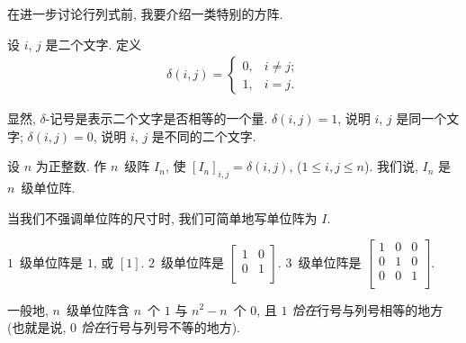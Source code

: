 在进一步讨论行列式前,
我要介绍一类特别的方阵.

\begin{definition}[\(\delta\)-记号]
    设 \(i\), \(j\) 是二个文字.
    定义
    \begin{align*}
        \delta(i, j)
        = \begin{cases}
              0, & i \neq j; \\
              1, & i = j.
          \end{cases}
    \end{align*}
\end{definition}

显然, \(\delta\)-记号是表示二个文字是否相等的一个量.
\(\delta(i, j) = 1\), 说明 \(i\), \(j\) 是同一个文字;
\(\delta(i, j) = 0\), 说明 \(i\), \(j\) 是不同的二个文字.

\begin{definition}[单位阵]
    设 \(n\) 为正整数.
    作 \(n\)~级阵 \(I_n\),
    使 \([I_n]_{i,j} = \delta(i, j)\),
    (\(1 \leq i, j \leq n\)).
    我们说, \(I_n\) 是 \(n\)~级单位阵.

    当我们不强调单位阵的尺寸时,
    我们可简单地写单位阵为 \(I\).
\end{definition}

\begin{example}
    \(1\)~级单位阵是 \(1\), 或 \([1]\).
    \(2\)~级单位阵是
    \(
    \begin{bmatrix}
        1 & 0 \\
        0 & 1 \\
    \end{bmatrix}.
    \)
    \(3\)~级单位阵是
    \(
    \begin{bmatrix}
        1 & 0 & 0 \\
        0 & 1 & 0 \\
        0 & 0 & 1 \\
    \end{bmatrix}.
    \)

    一般地, \(n\)~级单位阵含 \(n\)~个 \(1\)
    与 \(n^2 - n\)~个 \(0\),
    且 \(1\) \emph{恰在}行号与列号相等的地方
    (也就是说, \(0\) \emph{恰在}行号与列号不等的地方).
\end{example}

